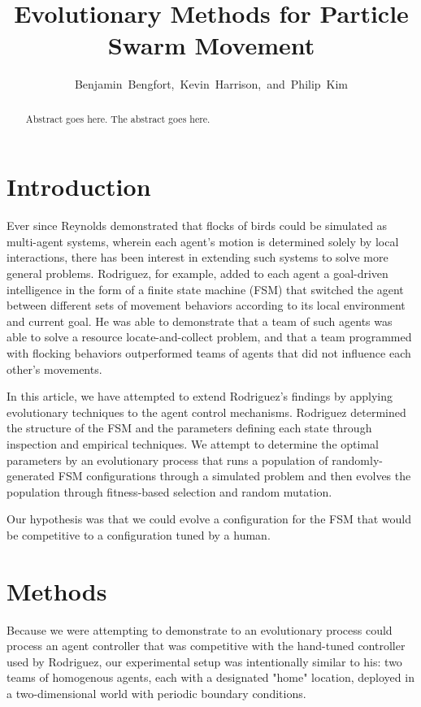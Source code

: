 \documentclass[12pt,journal,compsoc]{IEEEtran}
\begin{document}
\title{Evolutionary Methods for Particle Swarm Movement}
\author{Benjamin~Bengfort,~Kevin~Harrison,~and~Philip~Kim}

\maketitle

\begin{abstract}
Abstract goes here.
The abstract goes here.
\end{abstract}

\section{Introduction}

Ever since Reynolds demonstrated that flocks of birds could be simulated as multi-agent systems, wherein each agent's motion is determined solely by local interactions, there has been interest in extending such systems to solve more general problems. Rodriguez, for example, added to each agent a goal-driven intelligence in the form of a finite state machine (FSM) that switched the agent between different sets of movement behaviors according to its local environment and current goal. He was able to demonstrate that a team of such agents was able to solve a resource locate-and-collect problem, and that a team programmed with flocking behaviors outperformed teams of agents that did not influence each other's movements.

In this article, we have attempted to extend Rodriguez's findings by applying evolutionary techniques to the agent control mechanisms. Rodriguez determined the structure of the FSM and the parameters defining each state through inspection and empirical techniques. We attempt to determine the optimal parameters by an evolutionary process that runs a population of randomly-generated FSM configurations through a simulated problem and then evolves the population through fitness-based selection and random mutation.

Our hypothesis was that we could evolve a configuration for the FSM that would be competitive to a configuration tuned by a human.

\section{Methods}

Because we were attempting to demonstrate to an evolutionary process could process an agent controller that was  competitive with the hand-tuned controller used by Rodriguez, our experimental setup was intentionally similar to his: two teams of homogenous agents, each with a designated "home" location, deployed in a two-dimensional world with periodic boundary conditions.
\end{document}
